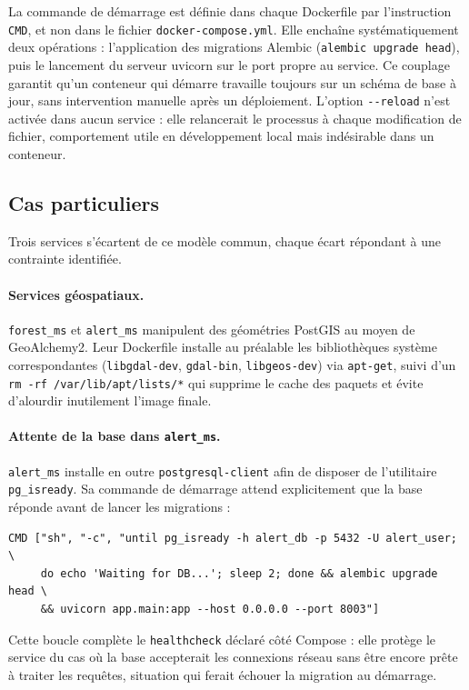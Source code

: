 La commande de démarrage est définie dans chaque Dockerfile par l'instruction
\texttt{CMD}, et non dans le fichier \texttt{docker-compose.yml}. Elle
enchaîne systématiquement deux opérations : l'application des migrations
Alembic (\texttt{alembic upgrade head}), puis le lancement du serveur uvicorn
sur le port propre au service. Ce couplage garantit qu'un conteneur qui
démarre travaille toujours sur un schéma de base à jour, sans intervention
manuelle après un déploiement. L'option \texttt{-{}-reload} n'est activée
dans aucun service : elle relancerait le processus à chaque modification de
fichier, comportement utile en développement local mais indésirable dans un
conteneur.

\subsection*{Cas particuliers}

Trois services s'écartent de ce modèle commun, chaque écart répondant à une
contrainte identifiée.

\paragraph{Services géospatiaux.}
\texttt{forest\_ms} et \texttt{alert\_ms} manipulent des géométries PostGIS
au moyen de GeoAlchemy2. Leur Dockerfile installe au préalable les
bibliothèques système correspondantes (\texttt{libgdal-dev},
\texttt{gdal-bin}, \texttt{libgeos-dev}) via \texttt{apt-get}, suivi d'un
\texttt{rm -rf /var/lib/apt/lists/*} qui supprime le cache des paquets et
évite d'alourdir inutilement l'image finale.

\paragraph{Attente de la base dans \texttt{alert\_ms}.}
\texttt{alert\_ms} installe en outre \texttt{postgresql-client} afin de
disposer de l'utilitaire \texttt{pg\_isready}. Sa commande de démarrage
attend explicitement que la base réponde avant de lancer les migrations :

\begin{verbatim}
CMD ["sh", "-c", "until pg_isready -h alert_db -p 5432 -U alert_user; \
     do echo 'Waiting for DB...'; sleep 2; done && alembic upgrade head \
     && uvicorn app.main:app --host 0.0.0.0 --port 8003"]
\end{verbatim}

Cette boucle complète le \texttt{healthcheck} déclaré côté Compose : elle
protège le service du cas où la base accepterait les connexions réseau sans
être encore prête à traiter les requêtes, situation qui ferait échouer la
migration au démarrage.

